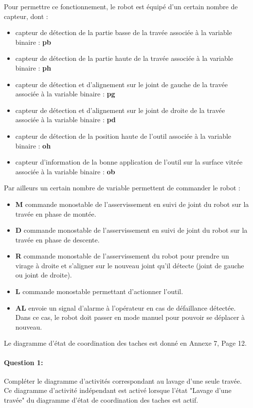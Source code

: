 Pour permettre ce fonctionnement, le robot est équipé d'un certain nombre de capteur, dont :
\begin{itemize}
 \item capteur de détection de la partie basse de la travée associée à la variable binaire : \textbf{pb}
 \item capteur de détection de la partie haute de la travée associée à la variable binaire : \textbf{ph}
 \item capteur de détection et d'alignement sur le joint de gauche de la travée associée à la variable binaire : \textbf{pg}
 \item capteur de détection et d'alignement sur le joint de droite de la travée associée à la variable binaire : \textbf{pd}
 \item capteur de détection de la position haute de l'outil associée à la variable binaire : \textbf{oh}
 \item capteur d'information de la bonne application de l'outil sur la surface vitrée associée à la variable binaire : \textbf{ob}
\end{itemize}

Par ailleurs un certain nombre de variable permettent de commander le robot :
\begin{itemize}
 \item \textbf{M} commande monostable de l'asservissement en suivi de joint du robot sur la travée en phase de montée.
 \item \textbf{D} commande monostable de l'asservissement en suivi de joint du robot sur la travée en phase de descente.
 \item \textbf{R} commande monostable de l'asservissement du robot pour prendre un virage à droite et s'aligner sur le nouveau joint qu'il détecte (joint de gauche ou joint de droite).
 \item \textbf{L} commande monostable permettant d'actionner l'outil.
 \item \textbf{AL} envoie un signal d'alarme à l'opérateur en cas de défaillance détectée. Dans ce cas, le robot doit passer en mode manuel pour pouvoir se déplacer à nouveau.
\end{itemize}

Le diagramme d'état de coordination des taches est donné en Annexe 7, Page 12.

\newpage

\paragraph{Question 1:} Compléter le diagramme d'activités correspondant au lavage d'une seule travée. Ce diagramme d'activité indépendant est activé lorsque l'état "Lavage d'une travée" du diagramme d'état de coordination des taches est actif.

